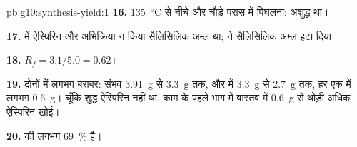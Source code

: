 \begin{solution}{pb:g10:synthesis-yield:1}
\textbf{16.} \qty{135}{\celsius} से नीचे और चौड़े परास में पिघलना:
 अशुद्ध था।

\textbf{17.}  में ऐस्पिरिन और अभिक्रिया न किया सैलिसिलिक
अम्ल था;  ने सैलिसिलिक अम्ल हटा दिया।

\textbf{18.} $R_f = 3.1 / 5.0 = 0.62$।

\textbf{19.} दोनों में लगभग बराबर: संभव \qty{3.91}{g} से
\qty{3.3}{g}  तक, और  में \qty{3.3}{g} से \qty{2.7}{g} तक,
हर एक में लगभग \qty{0.6}{g}। चूँकि  शुद्ध ऐस्पिरिन नहीं था,
काम के पहले भाग में वास्तव में \qty{0.6}{g} से थोड़ी अधिक
ऐस्पिरिन खोई।

\textbf{20.}  की  लगभग \qty{69}{\percent} है।
\end{solution}

